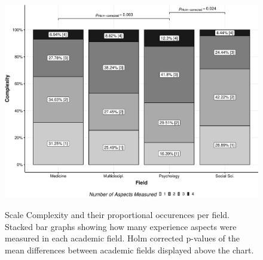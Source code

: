 \documentclass[man, 12pt, a4paper, mask]{apa7}
\begin{document}
\begin{figure}[h]
\centering
\caption{Scale Complexity and their proportional occurences per field. Stacked bar graphs showing how many experience aspects were measured in each academic field. Holm corrected p-values of the mean differences between academic fields displayed above the chart.}
\includegraphics[width=\textwidth]{Figures/FieldPlotComplexityAverage-1}
\label{fig:FieldPlotComplexityAverage}
\end{figure}
\end{document}
